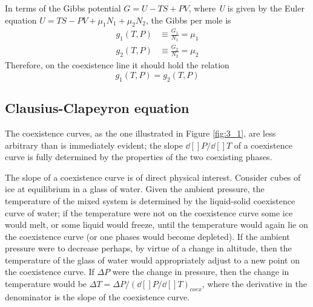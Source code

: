 \documentclass[../../Main/Main.tex]{subfiles}
\begin{document}
In terms of the Gibbs potential \( G = U- TS+PV \), where \emph{U} is given by  the Euler equation \( U = TS-PV+ \mu _1 N_1 + \mu _2 N_2 \), the Gibbs per mole is
\begin{subequations}
\begin{align}
  g_1 (T,P) &\equiv \frac{G_1}{N_1} = \mu _1 \\
  g_2 (T,P) &\equiv \frac{G_2}{N_2} = \mu _2
\end{align}
\label{}
\end{subequations}
Therefore, on the coexistence line it should hold the relation
\begin{equation}
  g_1 (T,P) = g_2 (T,P)
  \label{eq:}
\end{equation}

\subsection{Clausius-Clapeyron equation}
The coexistence curves, as the one illustrated in Figure  \ref{fig:3_1}, are less arbitrary than is immediately evident; the slope \( \dd[]{P} /\dd[]{T}   \) of a coexistence curve is fully determined by the properties of the two coexisting phases.

The slope of a coexistence curve is of direct physical interest. Consider cubes of ice at equilibrium in a glass of water. Given the ambient pressure, the temperature of the mixed system is determined by the liquid-solid coexistence curve of water; if the temperature were not on the coexistence curve some ice would melt, or some liquid would freeze, until the temperature would again lie on the coexistence curve (or one phases would become depleted). If the ambient pressure were to decrease perhaps, by virtue of a change in altitude, then the temperature of the glass of water would appropriately adjust to a new point on the coexistence curve. If \( \Delta P \) were the change in pressure, then the change in temperature would be \( \Delta T = \Delta P / (\dd[]{P} /\dd[]{T})_{coex} \), where the derivative in the denominator is the slope of the coexistence curve.
\end{document}
